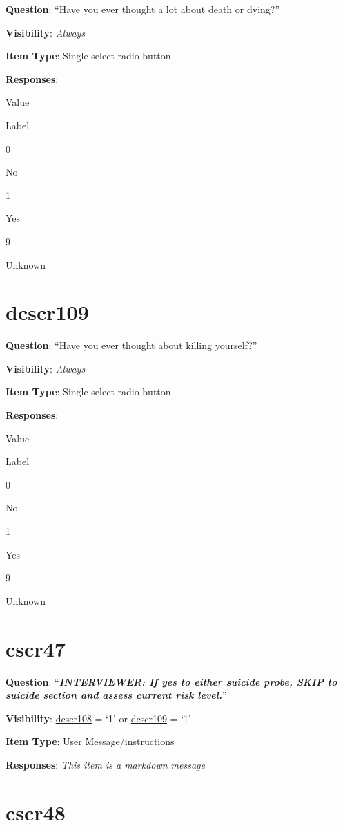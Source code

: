 \documentclass[]{book}
\begin{document}
\textbf{Question}: ``Have you ever thought a lot about death or dying?''

\textbf{Visibility}: \emph{Always}

\textbf{Item Type}: Single-select radio button

\textbf{Responses}:

Value

Label

0

No

1

Yes

9

Unknown

\hypertarget{dcscr109}{%
\section{dcscr109}\label{dcscr109}}

\textbf{Question}: ``Have you ever thought about killing yourself?''

\textbf{Visibility}: \emph{Always}

\textbf{Item Type}: Single-select radio button

\textbf{Responses}:

Value

Label

0

No

1

Yes

9

Unknown

\hypertarget{cscr47}{%
\section{cscr47}\label{cscr47}}

\textbf{Question}: ``\emph{\textbf{INTERVIEWER: If yes to either suicide probe, SKIP to suicide section and assess current risk level.}}''

\textbf{Visibility}: \protect\hyperlink{dcscr108}{dcscr108} = `1' or \protect\hyperlink{dcscr109}{dcscr109} = `1'

\textbf{Item Type}: User Message/instructions

\textbf{Responses}: \emph{This item is a markdown message}

\hypertarget{cscr48}{%
\section{cscr48}\label{cscr48}}
\end{document}
